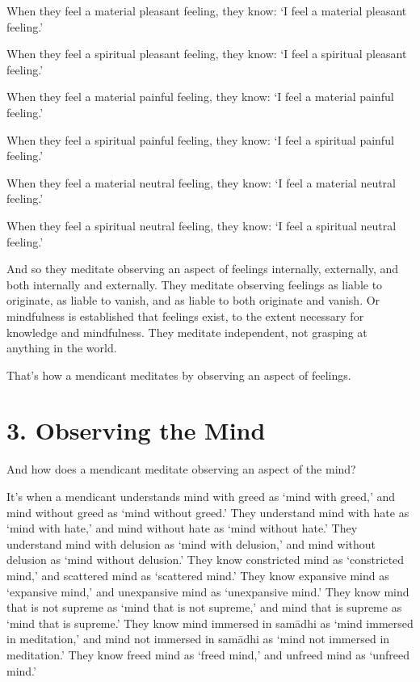 \documentclass[12pt,openany]{book}%
\begin{document}
When they feel a material pleasant feeling, they know: ‘I feel a material pleasant feeling.’ 

When they feel a spiritual pleasant feeling, they know: ‘I feel a spiritual pleasant feeling.’ 

When they feel a material painful feeling, they know: ‘I feel a material painful feeling.’ 

When they feel a spiritual painful feeling, they know: ‘I feel a spiritual painful feeling.’ 

When they feel a material neutral feeling, they know: ‘I feel a material neutral feeling.’ 

When they feel a spiritual neutral feeling, they know: ‘I feel a spiritual neutral feeling.’ 

And so they meditate observing an aspect of feelings internally, externally, and both internally and externally. They meditate observing feelings as liable to originate, as liable to vanish, and as liable to both originate and vanish. Or mindfulness is established that feelings exist, to the extent necessary for knowledge and mindfulness. They meditate independent, not grasping at anything in the world. 

That’s how a mendicant meditates by observing an aspect of feelings. 

\section*{3. Observing the Mind }

And how does a mendicant meditate observing an aspect of the mind? 

It’s when a mendicant understands mind with greed as ‘mind with greed,’ and mind without greed as ‘mind without greed.’ They understand mind with hate as ‘mind with hate,’ and mind without hate as ‘mind without hate.’ They understand mind with delusion as ‘mind with delusion,’ and mind without delusion as ‘mind without delusion.’ They know constricted mind as ‘constricted mind,’ and scattered mind as ‘scattered mind.’ They know expansive mind as ‘expansive mind,’ and unexpansive mind as ‘unexpansive mind.’ They know mind that is not supreme as ‘mind that is not supreme,’ and mind that is supreme as ‘mind that is supreme.’ They know mind immersed in \textsanskrit{samādhi} as ‘mind immersed in meditation,’ and mind not immersed in \textsanskrit{samādhi} as ‘mind not immersed in meditation.’ They know freed mind as ‘freed mind,’ and unfreed mind as ‘unfreed mind.’ 
\end{document}
